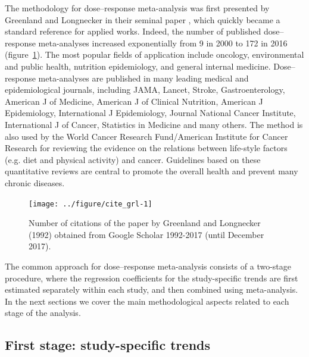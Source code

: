 \documentclass[11pt,a4paper,twoside,openany]{book}\usepackage{knitr}
\begin{document}
{\noindent The methodology for dose--response meta-analysis was first presented by Greenland and Longnecker in their seminal paper \citep{greenland1992methods}, which quickly became a standard reference for applied works. Indeed, the number of published dose--response meta-analyses increased exponentially from 9 in 2000 to 172 in 2016 (figure~\ref{fig:cite_grl}).
The most popular fields of application include oncology, environmental and public health, nutrition epidemiology, and general internal medicine. Dose--response meta-analyses are published in many leading medical and epidemiological journals, including JAMA, Lancet, Stroke, Gastroenterology, American J of Medicine, American J of Clinical Nutrition, American J Epidemiology, International J Epidemiology, Journal National Cancer Institute, International J of Cancer, Statistics in Medicine and many others. The method is also used by the World Cancer Research Fund/American Institute for Cancer Research for reviewing the evidence on the relations between life-style factors (e.g. diet and physical activity) and cancer. Guidelines based on these quantitative reviews are central to promote the overall health and prevent many chronic diseases.

\begin{knitrout}\footnotesize
{}\color{fgcolor}\begin{figure}[ht!]

{\centering \texttt{[image: ../figure/cite\_grl-1]} 

}

\caption[Number of citations of the paper by Greenland and Longnecker (1992) obtained from Google Scholar 1992-2017 (until December 2017)]{Number of citations of the paper by Greenland and Longnecker (1992) obtained from Google Scholar 1992-2017 (until December 2017).}\label{fig:cite_grl}
\end{figure}


\end{knitrout}

The common approach for dose--response meta-analysis consists of a two-stage procedure, where the regression coefficients for the study-specific trends are first estimated separately within each study, and then combined using meta-analysis. In the next sections we cover the main methodological aspects related to each stage of the analysis.


\subsection{First stage: study-specific trends}\label{sec:1st_stage}

}
\end{document}
